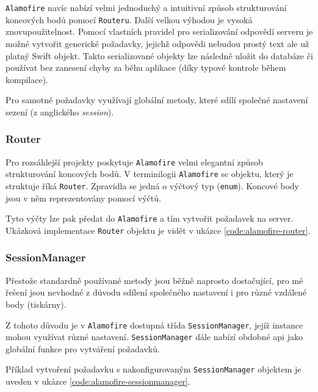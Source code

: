 \texttt{Alamofire} navíc nabízí velmi jednoduchý a intuitivní způsob strukturování koncových bodů pomocí \texttt{Routeru}.
Další velkou výhodou je vysoká znovupoužitelnost.
Pomocí vlastních pravidel pro serializování odpovědí serveru je možné vytvořit generické požadavky, jejichž odpovědi nebudou prostý text ale už platný Swift objekt.
Takto serializované objekty lze následně uložit do databáze či používat bez zanesení chyby za běhu aplikace (díky typové kontrole během kompilace).

Pro samotné požadavky využívají globální metody, které sdílí společné nastavení sezení (z anglického \textit{session}).

\subsubsection*{Router}

Pro rozsáhlejší projekty poskytuje \texttt{Alamofire} velmi elegantní způsob strukturování koncových bodů.
V terminilogii \texttt{Alamofire} se objektu, který je struktuje říká \texttt{Router}.
Zpravidla se jedná o výčtový typ (\texttt{enum}).
Koncové body jsou v něm reprezentovány pomocí výčtů.

Tyto výčty lze pak předat do \texttt{Alamofire} a tím vytvořit požadavek na server.
Ukázková implementace \texttt{Router} objektu je vidět v ukázce \ref{code:alamofire-router}.


\subsubsection*{SessionManager}

Přestože standardně používané metody jsou běžně naprosto dostačující, pro mé řešení jsou nevhodné z důvodu sdílení společného nastavení i pro různé vzdálené body (tiskárny).

Z tohoto důvodu je v \texttt{Alamofire} dostupná třída \texttt{SessionManager}, jejíž instance mohou využívat různé nastavení.
\texttt{SessionManager} dále nabízí obdobné \acrshort{api} jako globální funkce pro vytváření požadavků.

Příklad vytvoření požadavku s nakonfigurovaným \texttt{SessionManager} objektem je uveden v ukázce \ref{code:alamofire-sessionmanager}.



